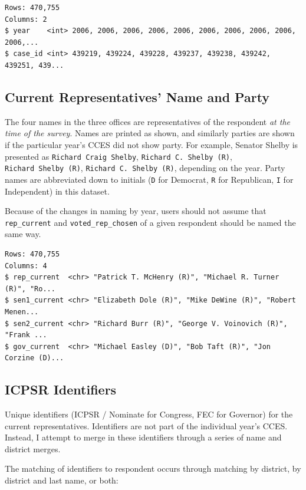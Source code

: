 \documentclass[10pt,article,oneside]{memoir}
\theoremstyle{definition}
\begin{document}
\begin{verbatim}
Rows: 470,755
Columns: 2
$ year    <int> 2006, 2006, 2006, 2006, 2006, 2006, 2006, 2006, 2006, 2006,...
$ case_id <int> 439219, 439224, 439228, 439237, 439238, 439242, 439251, 439...
\end{verbatim}

\hypertarget{current-representatives-name-and-party}{%
\subsection{Current Representatives' Name and
Party}\label{current-representatives-name-and-party}}

The four names in the three offices are representatives of the
respondent \emph{at the time of the survey}. Names are printed as shown,
and similarly parties are shown if the particular year's CCES did not
show party. For example, Senator Shelby is presented as
\texttt{Richard\ Craig\ Shelby}, \texttt{Richard\ C.\ Shelby\ (R)},
\texttt{Richard\ Shelby\ (R)}, \texttt{Richard\ C.\ Shelby\ (R)},
depending on the year. Party names are abbreviated down to initials
(\texttt{D} for Democrat, \texttt{R} for Republican, \texttt{I} for
Independent) in this dataset.

Because of the changes in naming by year, users should not assume that
\texttt{rep\_current} and \texttt{voted\_rep\_chosen} of a given
respondent should be named the same way.

\begin{verbatim}
Rows: 470,755
Columns: 4
$ rep_current  <chr> "Patrick T. McHenry (R)", "Michael R. Turner (R)", "Ro...
$ sen1_current <chr> "Elizabeth Dole (R)", "Mike DeWine (R)", "Robert Menen...
$ sen2_current <chr> "Richard Burr (R)", "George V. Voinovich (R)", "Frank ...
$ gov_current  <chr> "Michael Easley (D)", "Bob Taft (R)", "Jon Corzine (D)...
\end{verbatim}

\hypertarget{icpsr-identifiers}{%
\subsection{ICPSR Identifiers}\label{icpsr-identifiers}}

Unique identifiers (ICPSR / Nominate for Congress, FEC for Governor) for
the current representatives. Identifiers are not part of the individual
year's CCES. Instead, I attempt to merge in these identifiers through a
series of name and district merges.

The matching of identifiers to respondent occurs through matching by
district, by district and last name, or both:
\end{document}
